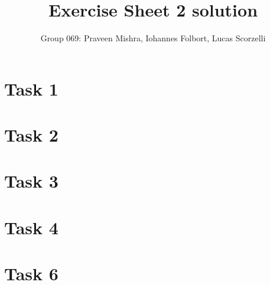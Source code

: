 \documentclass[
	11pt, 
	DIV10,
	a4paper, 
	oneside, 
	headings=normal, 
	captions=tableheading,
	final, 
	numbers=noenddot
]{scrartcl}
\title{Exercise Sheet 2 solution}
\author{Group 069: Praveen Mishra, Iohannes Folbort, Lucas Scorzelli}
\begin{document}
\maketitle
\newpage



\section*{Task 1}

\newpage

\section*{Task 2}
\newpage

\section*{Task 3}

\newpage

\section*{Task 4}

\newpage

\section*{Task 6}

\newpage
\end{document}
